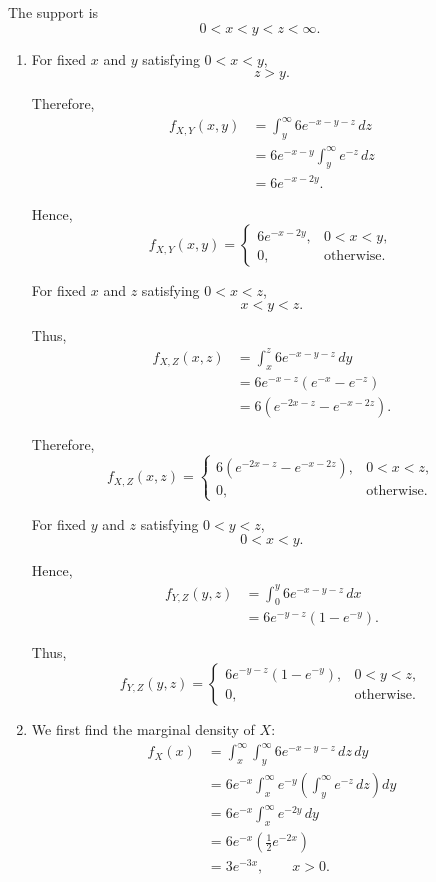 \documentclass[11pt]{article}
\newenvironment{solution}{
    \par
    \begin{tcolorbox}[
        colback=white,
        colframe=uwgold,
        boxrule=0.7pt,
        arc=2mm,
        left=3mm,
        right=3mm,
        top=2mm,
        bottom=2mm,
        breakable,
        before skip=0.5em,
        after skip=1em,
        title=\textbf{Solution},
        coltitle=uwpurple,
        fonttitle=\bfseries
    ]
}{
    \end{tcolorbox}
}
\begin{document}
\begin{solution}

The support is
\[
0<x<y<z<\infty.
\]

\begin{enumerate}[label=(\alph*)]

\item For fixed \(x\) and \(y\) satisfying \(0<x<y\),
\[
z>y.
\]

Therefore,
\[
\begin{aligned}
f_{X,Y}(x,y)
&=
\int_y^\infty
6e^{-x-y-z}\,dz\\
&=
6e^{-x-y}
\int_y^\infty e^{-z}\,dz\\
&=
6e^{-x-2y}.
\end{aligned}
\]

Hence,
\[
f_{X,Y}(x,y)
=
\begin{cases}
6e^{-x-2y}, & 0<x<y,\\
0, & \text{otherwise}.
\end{cases}
\]

For fixed \(x\) and \(z\) satisfying \(0<x<z\),
\[
x<y<z.
\]

Thus,
\[
\begin{aligned}
f_{X,Z}(x,z)
&=
\int_x^z
6e^{-x-y-z}\,dy\\
&=
6e^{-x-z}
\left(e^{-x}-e^{-z}\right)\\
&=
6\left(
e^{-2x-z}-e^{-x-2z}
\right).
\end{aligned}
\]

Therefore,
\[
f_{X,Z}(x,z)
=
\begin{cases}
6\left(e^{-2x-z}-e^{-x-2z}\right),
&
0<x<z,\\
0,
&
\text{otherwise}.
\end{cases}
\]

For fixed \(y\) and \(z\) satisfying \(0<y<z\),
\[
0<x<y.
\]

Hence,
\[
\begin{aligned}
f_{Y,Z}(y,z)
&=
\int_0^y
6e^{-x-y-z}\,dx\\
&=
6e^{-y-z}(1-e^{-y}).
\end{aligned}
\]

Thus,
\[
f_{Y,Z}(y,z)
=
\begin{cases}
6e^{-y-z}(1-e^{-y}),
&
0<y<z,\\
0,
&
\text{otherwise}.
\end{cases}
\]

\item We first find the marginal density of \(X\):
\[
\begin{aligned}
f_X(x)
&=
\int_x^\infty
\int_y^\infty
6e^{-x-y-z}\,dz\,dy\\
&=
6e^{-x}
\int_x^\infty
e^{-y}
\left(
\int_y^\infty e^{-z}\,dz
\right)dy\\
&=
6e^{-x}
\int_x^\infty e^{-2y}\,dy\\
&=
6e^{-x}
\left(\frac12e^{-2x}\right)\\
&=
3e^{-3x},
\qquad x>0.
\end{aligned}
\]


\end{enumerate}
\end{solution}
\end{document}
